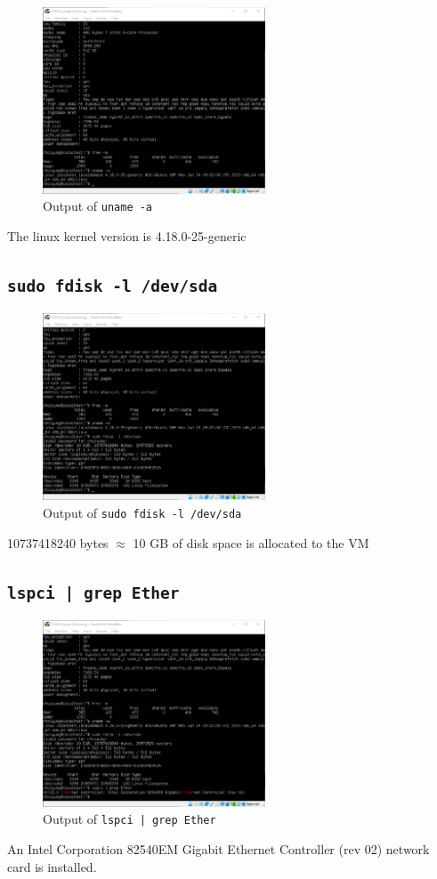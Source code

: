 \documentclass{article}
\begin{document}
\begin{figure}[H]

  \caption{Output of \texttt{uname -a}}
  \centering
  \includegraphics[width=0.59\textwidth]{ECE4310_Proj3_2_uname.png}
\end{figure}

The linux kernel version is 4.18.0-25-generic


\subsection{\texttt{sudo fdisk -l /dev/sda}}

\begin{figure}[H]

  \caption{Output of \texttt{sudo fdisk -l /dev/sda}}
  \centering
  \includegraphics[width=0.59\textwidth]{ECE4310_Proj3_2_fdisk.png}
\end{figure}

10737418240 bytes $\approx$ 10 GB of disk space is allocated to the VM

\subsection{\texttt{lspci | grep Ether}}

\begin{figure}[H]

  \caption{Output of \texttt{lspci | grep Ether}}
  \centering
  \includegraphics[width=0.59\textwidth]{ECE4310_Proj3_2_lspci.png}
\end{figure}

An Intel Corporation 82540EM Gigabit Ethernet Controller (rev 02) network card is installed.
\end{document}
